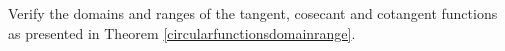 {Verify the domains and ranges of the tangent, cosecant and cotangent functions as presented in Theorem \ref{circularfunctionsdomainrange}.}
{}
